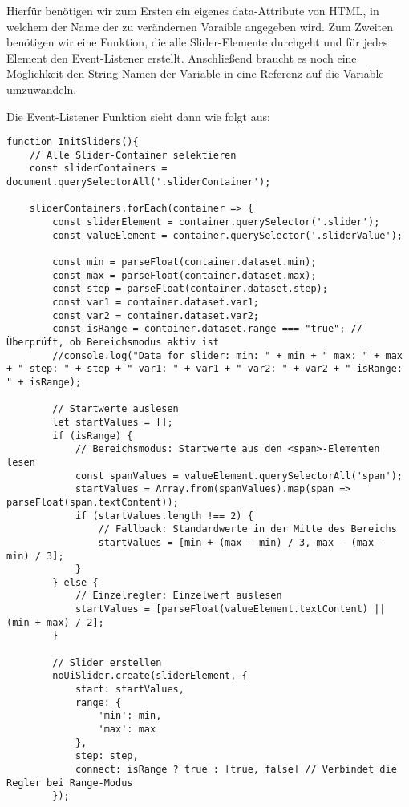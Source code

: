 Hierfür benötigen wir zum Ersten ein eigenes data-Attribute von HTML, in welchem der Name der zu verändernen Varaible angegeben wird. Zum Zweiten benötigen wir eine Funktion, die alle Slider-Elemente durchgeht und für jedes Element den Event-Listener erstellt. Anschließend braucht es noch eine Möglichkeit den String-Namen der Variable in eine Referenz auf die Variable umzuwandeln.

Die Event-Listener Funktion sieht dann wie folgt aus:

\begin{lstlisting}[style=JavaScript]
function InitSliders(){
    // Alle Slider-Container selektieren
    const sliderContainers = document.querySelectorAll('.sliderContainer');

    sliderContainers.forEach(container => {
        const sliderElement = container.querySelector('.slider');
        const valueElement = container.querySelector('.sliderValue');

        const min = parseFloat(container.dataset.min);
        const max = parseFloat(container.dataset.max);
        const step = parseFloat(container.dataset.step);
        const var1 = container.dataset.var1;
        const var2 = container.dataset.var2;
        const isRange = container.dataset.range === "true"; // Überprüft, ob Bereichsmodus aktiv ist
        //console.log("Data for slider: min: " + min + " max: " + max + " step: " + step + " var1: " + var1 + " var2: " + var2 + " isRange: " + isRange);

        // Startwerte auslesen
        let startValues = [];
        if (isRange) {
            // Bereichsmodus: Startwerte aus den <span>-Elementen lesen
            const spanValues = valueElement.querySelectorAll('span');
            startValues = Array.from(spanValues).map(span => parseFloat(span.textContent));
            if (startValues.length !== 2) {
                // Fallback: Standardwerte in der Mitte des Bereichs
                startValues = [min + (max - min) / 3, max - (max - min) / 3];
            }
        } else {
            // Einzelregler: Einzelwert auslesen
            startValues = [parseFloat(valueElement.textContent) || (min + max) / 2];
        }

        // Slider erstellen
        noUiSlider.create(sliderElement, {
            start: startValues,
            range: {
                'min': min,
                'max': max
            },
            step: step,
            connect: isRange ? true : [true, false] // Verbindet die Regler bei Range-Modus
        });


\end{lstlisting}
